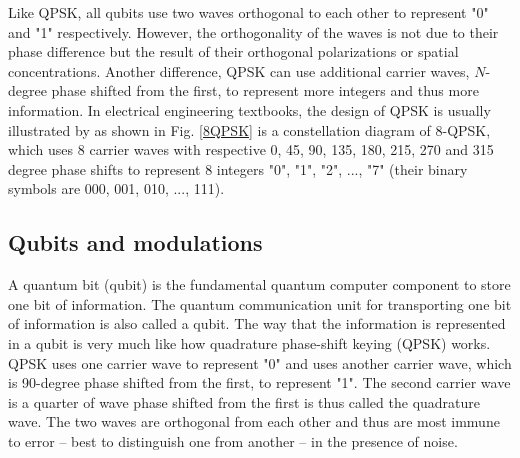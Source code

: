 \documentclass{book}
\begin{document}
Like QPSK, all qubits use two waves orthogonal to each other to represent "0" and "1" respectively. However, the orthogonality of the waves is not due to their phase difference but the result of their orthogonal polarizations or spatial concentrations. Another difference, QPSK can use additional carrier waves, $N$-degree phase shifted from the first, to represent more integers and thus more information. In electrical engineering textbooks, the design of QPSK is usually illustrated by as shown in Fig. \ref{8QPSK} is a constellation diagram of 8-QPSK, which uses 8 carrier waves with respective 0, 45, 90, 135, 180, 215, 270 and 315 degree phase shifts to represent 8 integers "0", "1", "2", ..., "7" (their binary symbols are 000, 001, 010, ..., 111).

\subsection{Qubits and modulations}
A quantum bit (qubit) is the fundamental quantum computer component to store one bit of information. The quantum communication unit for transporting one bit of information is also called a qubit. The way that the information is represented in a qubit is very much like how quadrature phase-shift keying (QPSK) works. QPSK uses one carrier wave to represent "0" and uses another carrier wave, which is 90-degree phase shifted from the first, to represent "1". The second carrier wave is a quarter of wave phase shifted from the first is thus called the quadrature wave. The two waves are orthogonal from each other and thus are most immune to error -- best to distinguish one from another -- in the presence of noise.
\end{document}

